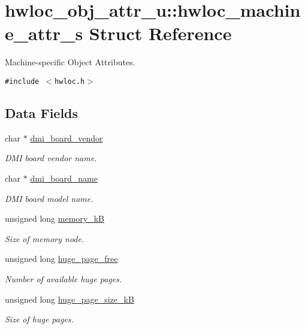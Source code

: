 \hypertarget{structhwloc__obj__attr__u_1_1hwloc__machine__attr__s}{
\section{hwloc\_\-obj\_\-attr\_\-u::hwloc\_\-machine\_\-attr\_\-s Struct Reference}
\label{structhwloc__obj__attr__u_1_1hwloc__machine__attr__s}
}
Machine-specific Object Attributes.  


{\tt \#include $<$hwloc.h$>$}

\subsection*{Data Fields}
\begin{CompactItemize}
\item 
char $\ast$ \hyperlink{structhwloc__obj__attr__u_1_1hwloc__machine__attr__s_ae85be0b4ebb86501718c4b460df5167}{dmi\_\-board\_\-vendor}
\begin{CompactList}\small\item\em DMI board vendor name. \item\end{CompactList}\item 
char $\ast$ \hyperlink{structhwloc__obj__attr__u_1_1hwloc__machine__attr__s_8b99af84fd38753a91c861f0e856b461}{dmi\_\-board\_\-name}
\begin{CompactList}\small\item\em DMI board model name. \item\end{CompactList}\item 
unsigned long \hyperlink{structhwloc__obj__attr__u_1_1hwloc__machine__attr__s_de283aa936a98b982fdd395d59c3ee32}{memory\_\-kB}
\begin{CompactList}\small\item\em Size of memory node. \item\end{CompactList}\item 
unsigned long \hyperlink{structhwloc__obj__attr__u_1_1hwloc__machine__attr__s_87ff3de9e181599328be92c932cb7a16}{huge\_\-page\_\-free}
\begin{CompactList}\small\item\em Number of available huge pages. \item\end{CompactList}\item 
unsigned long \hyperlink{structhwloc__obj__attr__u_1_1hwloc__machine__attr__s_f9d440e06744c23670a7b2e3a060abb9}{huge\_\-page\_\-size\_\-kB}
\begin{CompactList}\small\item\em Size of huge pages. \item\end{CompactList}\end{CompactItemize}


